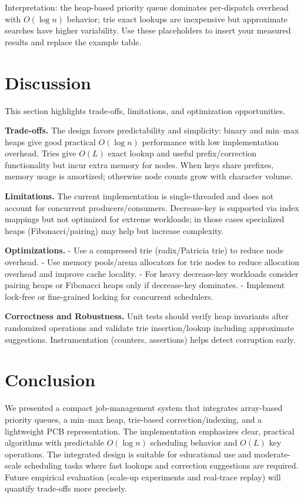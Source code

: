 \documentclass[conference,10pt]{IEEEtran}
\begin{document}
Interpretation: the heap-based priority queue dominates per-dispatch overhead with $O(\log n)$ behavior; trie exact lookups are inexpensive but approximate searches have higher variability. Use these placeholders to insert your measured results and replace the example table.

\section{Discussion}
This section highlights trade-offs, limitations, and optimization opportunities.

\textbf{Trade-offs.} The design favors predictability and simplicity: binary and min--max heaps give good practical $O(\log n)$ performance with low implementation overhead. Tries give $O(L)$ exact lookup and useful prefix/correction functionality but incur extra memory for nodes. When keys share prefixes, memory usage is amortized; otherwise node counts grow with character volume.

\textbf{Limitations.} The current implementation is single-threaded and does not account for concurrent producers/consumers. Decrease-key is supported via index mappings but not optimized for extreme workloads; in those cases specialized heaps (Fibonacci/pairing) may help but increase complexity.

\textbf{Optimizations.}
- Use a compressed trie (radix/Patricia trie) to reduce node overhead.
- Use memory pools/arena allocators for trie nodes to reduce allocation overhead and improve cache locality.
- For heavy decrease-key workloads consider pairing heaps or Fibonacci heaps only if decrease-key dominates.
- Implement lock-free or fine-grained locking for concurrent schedulers.

\textbf{Correctness and Robustness.} Unit tests should verify heap invariants after randomized operations and validate trie insertion/lookup including approximate suggestions. Instrumentation (counters, assertions) helps detect corruption early.

\section{Conclusion}
We presented a compact job-management system that integrates array-based priority queues, a min--max heap, trie-based correction/indexing, and a lightweight PCB representation. The implementation emphasizes clear, practical algorithms with predictable $O(\log n)$ scheduling behavior and $O(L)$ key operations. The integrated design is suitable for educational use and moderate-scale scheduling tasks where fast lookups and correction suggestions are required. Future empirical evaluation (scale-up experiments and real-trace replay) will quantify trade-offs more precisely.
\end{document}
